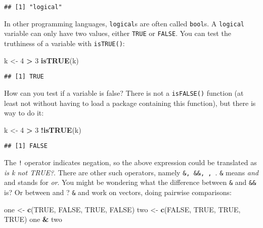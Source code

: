 \documentclass[
]{article}
\newenvironment{Shaded}{\begin{snugshade}}{\end{snugshade}}
\newcommand{\DecValTok}[1]{\textcolor[rgb]{0.00,0.00,0.81}{#1}}
\newcommand{\KeywordTok}[1]{\textcolor[rgb]{0.13,0.29,0.53}{\textbf{#1}}}
\newcommand{\NormalTok}[1]{#1}
\newcommand{\OperatorTok}[1]{\textcolor[rgb]{0.81,0.36,0.00}{\textbf{#1}}}
\newcommand{\OtherTok}[1]{\textcolor[rgb]{0.56,0.35,0.01}{#1}}
\newcommand{\StringTok}[1]{\textcolor[rgb]{0.31,0.60,0.02}{#1}}
\begin{document}
\begin{verbatim}
## [1] "logical"
\end{verbatim}

In other programming languages, \texttt{logical}s are often called \texttt{bool}s. A \texttt{logical} variable can only have
two values, either \texttt{TRUE} or \texttt{FALSE}. You can test the truthiness of a variable with \texttt{isTRUE()}:

\begin{Shaded}
\begin{Highlighting}[]
\NormalTok{k \textless{}{-}}\StringTok{ }\DecValTok{4} \OperatorTok{\textgreater{}}\StringTok{ }\DecValTok{3}
\KeywordTok{isTRUE}\NormalTok{(k)}
\end{Highlighting}
\end{Shaded}

\begin{verbatim}
## [1] TRUE
\end{verbatim}

How can you test if a variable is false? There is not a \texttt{isFALSE()} function (at least not without having
to load a package containing this function), but there is way to do it:

\begin{Shaded}
\begin{Highlighting}[]
\NormalTok{k \textless{}{-}}\StringTok{ }\DecValTok{4} \OperatorTok{\textgreater{}}\StringTok{ }\DecValTok{3}
\OperatorTok{!}\KeywordTok{isTRUE}\NormalTok{(k)}
\end{Highlighting}
\end{Shaded}

\begin{verbatim}
## [1] FALSE
\end{verbatim}

The \texttt{!} operator indicates negation, so the above expression could be translated as \emph{is k not TRUE?}.
There are other such operators, namely \texttt{\&,\ \&\&,\ \textbar{},\ \textbar{}\textbar{}}. \texttt{\&} means \emph{and} and \texttt{\textbar{}} stands for \emph{or}.
You might be wondering what the difference between \texttt{\&} and \texttt{\&\&} is? Or between \texttt{\textbar{}} and \texttt{\textbar{}\textbar{}}? \texttt{\&} and
\texttt{\textbar{}} work on vectors, doing pairwise comparisons:

\begin{Shaded}
\begin{Highlighting}[]
\NormalTok{one \textless{}{-}}\StringTok{ }\KeywordTok{c}\NormalTok{(}\OtherTok{TRUE}\NormalTok{, }\OtherTok{FALSE}\NormalTok{, }\OtherTok{TRUE}\NormalTok{, }\OtherTok{FALSE}\NormalTok{)}
\NormalTok{two \textless{}{-}}\StringTok{ }\KeywordTok{c}\NormalTok{(}\OtherTok{FALSE}\NormalTok{, }\OtherTok{TRUE}\NormalTok{, }\OtherTok{TRUE}\NormalTok{, }\OtherTok{TRUE}\NormalTok{)}
\NormalTok{one }\OperatorTok{\&}\StringTok{ }\NormalTok{two}
\end{Highlighting}
\end{Shaded}
\end{document}
